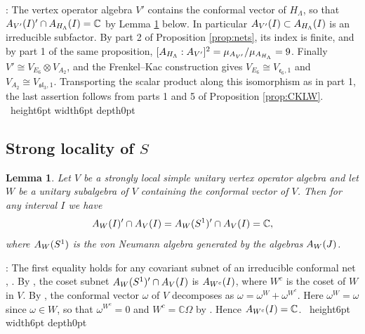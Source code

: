 \documentclass[leqno]{article}
\newcommand{\Cbb}{\ensuremath{\mathbb{C}}}
\let\cal\relax
\newcommand{\cal}{\mathcal}
\newcommand{\qed}{\hfill \vrule height6pt  width6pt depth0pt}
\newcommand{\ot}{\otimes}
\newtheorem{lemma}[thm]{Lemma}
\newenvironment{proof}[1][]{\noindent {\it Proof #1} : }{\hbox{~}\qed
\smallskip
}
\numberwithin{equation}{section}
\begin{document}
\begin{proof}
The vertex operator algebra $V'$ contains the conformal vector of $H_\Lambda$, so that $\cal A_{V'}(I)' \cap \cal A_{H_\Lambda}(I) = \Cbb$ by Lemma \ref{lem:trivial-coset} below. In particular $\cal A_{V'}(I) \subset \cal A_{H_\Lambda}(I)$ is an irreducible subfactor. By part 2 of Proposition \ref{prop:nets}, its index is finite, and by part 1 of the same proposition, $[\cal A_{H_\Lambda}:\cal A_{V'}]^2 = \mu_{\cal A_{V'}}/\mu_{\cal A_{H_\Lambda}} = 9$. Finally $V' \cong V_{E_6} \ot V_{A_2}$, and the Frenkel--Kac construction gives $V_{E_6} \cong V_{\mathfrak e_6,1}$ and $V_{A_2} \cong V_{\mathfrak{sl}_3,1}$. Transporting the scalar product along this isomorphism as in part 1, the last assertion follows from parts 1 and 5 of Proposition \ref{prop:CKLW}.
\end{proof}

\subsection{Strong locality of \texorpdfstring{$S$}{S}}
\label{subsec:strong-locality}

\begin{lemma}
\label{lem:trivial-coset}
Let $V$ be a strongly local simple unitary vertex operator algebra and let $W$ be a unitary subalgebra of $V$ containing the conformal vector of $V$. Then for any interval $I$ we have
\[
\cal A_W(I)' \cap \cal A_V(I) = \cal A_W(S^1)' \cap \cal A_V(I) = \Cbb,
\]
where $\cal A_W(S^1)$ is the von Neumann algebra generated by the algebras $\cal A_W(J)$.
\end{lemma}

\begin{proof}
The first equality holds for any covariant subnet of an irreducible conformal net \cite[Example 3.7 p.~24]{CKLW18}, \cite{Kos04}. By \cite[Proposition 7.8 p.~58]{CKLW18}, the coset subnet $\cal A_W(S^1)' \cap \cal A_V(I)$ is $\cal A_{W^c}(I)$, where $W^c$ is the coset of $W$ in $V$. By \cite[Proposition 5.31 p.~45]{CKLW18}, the conformal vector $\omega$ of $V$ decomposes as $\omega = \omega^W+\omega^{W^c}$. Here $\omega^W = \omega$ since $\omega \in W$, so that $\omega^{W^c} = 0$ and $W^c = \Cbb\Omega$ by \cite[Remark 5.30 p.~45]{CKLW18}. Hence $\cal A_{W^c}(I) = \Cbb$.
\end{proof}
\end{document}
